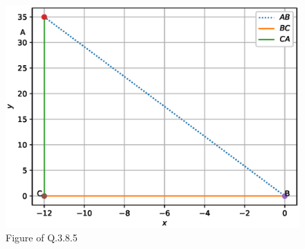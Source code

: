 \begin{enumerate}[label=\thesection.\arabic*.,ref=\thesection.\theenumi]
\begin{figure}[!ht]
	\centering
	\includegraphics[width=\columnwidth]{./figs/lines/q12.eps}
	\caption{Figure of Q.3.8.5}
	\label{fig:qtwelve}	
	\end{figure}
	


\end{enumerate}
